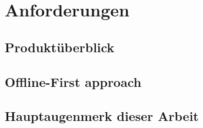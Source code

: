 \chapter{Anforderungen}

\section{Produktüberblick}

\section{}

\section{Offline-First approach} 

\section{Hauptaugenmerk dieser Arbeit}
